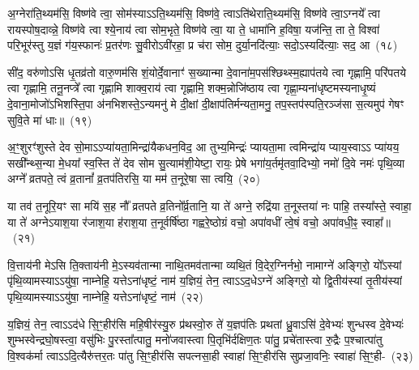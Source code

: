 {\anuvakamend[{मि॒त्रस्य॒ त्रयो॑विꣳशतिश्च}]}%

अ॒ग्नेरा॑ति॒थ्यम॑सि॒ विष्ण॑वे त्वा॒ सोम॑स्या\-ऽऽ\-ति॒थ्यम॑सि॒ विष्ण॑वे॒ त्वा\-ऽति॑थेराति॒थ्यम॑सि॒ विष्ण॑वे त्वा॒\-ऽग्नये᳚ त्वा रायस्पोष॒दाव्न्ने॒ विष्ण॑वे त्वा श्ये॒नाय॑ त्वा सोम॒भृते॒ विष्ण॑वे त्वा॒ या ते॒ धामा॑नि ह॒विषा॒ यज॑न्ति॒ ता ते॒ विश्वा॑ परि॒भूर॑स्तु य॒ज्ञं ग॑य॒स्फानः॑ प्र॒तर॑णः सु॒वीरो\-ऽवी॑रहा॒ प्र च॑रा सोम॒ दुर्या॒नदि॑त्याः॒ सदो॒\-ऽस्यदि॑त्याः॒ सद॒ आ~(१८)

सी॑द॒ वरु॑णो\-ऽसि धृ॒तव्र॑तो वारु॒णम॑सि शं॒योर्दे॒वानाꣳ॑ स॒ख्यान्मा दे॒वाना॑म॒प\-स॑श्छिथ्स्म॒\-ह्याप॑तये त्वा गृह्णामि॒ परि॑पतये त्वा गृह्णामि॒ तनू॒नप्त्रे᳚ त्वा गृह्णामि शाक्व॒राय॑ त्वा गृह्णामि॒ शक्म॒न्नोजि॑ष्ठाय त्वा गृह्णा॒म्यना॑धृष्टम\-स्यनाधृ॒ष्यं दे॒वाना॒मोजो॑\-ऽभिशस्ति॒पा अ॑नभिशस्ते॒\-ऽन्यमनु॑ मे दी॒क्षां दी॒क्षाप॑तिर्मन्यता॒मनु॒ तप॒स्तप॑स्पति॒रञ्ज॑सा स॒त्यमुप॑ गेषꣳ सुवि॒ते मा॑ धाः॥~(१९)

{\anuvakamend[{आ मैकं॑ च}]}%

अ॒ꣳ॒शुरꣳ॑शुस्ते देव सो॒मा\-ऽऽ\-प्या॑यता॒मिन्द्रा॑यैकधन॒विद॒ आ तुभ्य॒मिन्द्रः॑ प्यायता॒मा त्वमिन्द्रा॑य प्याय॒स्वा\-ऽऽ\- प्या॑यय॒ सखी᳚न्थ्स॒न्या मे॒धया᳚ स्व॒स्ति ते॑ देव सोम सु॒त्याम॑शी॒येष्टा॒ रायः॒ प्रेषे भगा॑य॒र्तमृ॑तवा॒दिभ्यो॒ नमो॑ दि॒वे नमः॑ पृथि॒व्या अग्ने᳚ व्रतपते॒ त्वं व्र॒तानां᳚ व्र॒तप॑तिरसि॒ या मम॑ त॒नूरे॒षा सा त्वयि॒~(२०)

या तव॑ त॒नूरि॒यꣳ सा मयि॑ स॒ह नौ᳚ व्रतपते व्र॒तिनो᳚र्व्र॒तानि॒ या ते॑ अग्ने॒ रुद्रि॑या त॒नूस्तया॑ नः पाहि॒ तस्या᳚स्ते॒ स्वाहा॒ या ते॑ अग्ने\-ऽयाश॒या र॑जाश॒या ह॑राश॒या त॒नूर्वर्\mbox{}षि॑ष्ठा गह्वरे॒ष्ठोग्रं वचो॒ अपा॑वधीं त्वे॒षं वचो॒ अपा॑वधी॒ꣴ॒ स्वाहा᳚॥~(२१)

{\anuvakamend[{त्वयि॑ चत्वारि॒ꣳ॒शच्च॑}]}%

वि॒त्ताय॑नी मे\-ऽसि ति॒क्ताय॑नी मे॒\-ऽस्यव॑तान्मा नाथि॒तमव॑तान्मा व्यथि॒तं वि॒देर॒ग्निर्नभो॒ नामाग्ने॑ अङ्गिरो॒ यो᳚\-ऽस्यां पृ॑थि॒व्यामस्या\-ऽऽ\-यु॑षा॒ नाम्नेहि॒ यत्ते\-ऽना॑धृष्टं॒ नाम॑ य॒ज्ञियं॒ तेन॒ त्वा\-ऽऽ\-द॒धे\-ऽग्ने॑ अङ्गिरो॒ यो द्वि॒तीय॑स्यां तृ॒तीय॑स्यां पृथि॒व्यामस्या\-ऽऽ\-यु॑षा॒ नाम्नेहि॒ यत्ते\-ऽना॑धृष्टं॒ नाम॑~(२२)

य॒ज्ञियं॒ तेन॒ त्वा\-ऽऽ\-द॑धे सि॒ꣳ॒हीर॑सि महि॒षीर॑स्यु॒रु प्र॑थस्वो॒रु ते॑ य॒ज्ञप॑तिः प्रथतां ध्रु॒वा\-ऽसि॑ दे॒वेभ्यः॑ शुन्धस्व दे॒वेभ्यः॑ शुम्भस्वेन्द्रघो॒षस्त्वा॒ वसु॑भिः पु॒रस्ता᳚त्पातु॒ मनो॑जवास्त्वा पि॒तृभि॑र्दक्षिण॒तः पा॑तु॒ प्रचे॑तास्त्वा रु॒द्रैः प॒श्चात्पा॑तु वि॒श्वक॑र्मा त्वा\-ऽऽ\-दि॒त्यैरु॑त्तर॒तः पा॑तु सि॒ꣳ॒हीर॑सि सपत्नसा॒ही स्वाहा॑ सि॒ꣳ॒हीर॑सि सुप्रजा॒वनिः॒ स्वाहा॑ सि॒ꣳ॒ही-~(२३)

